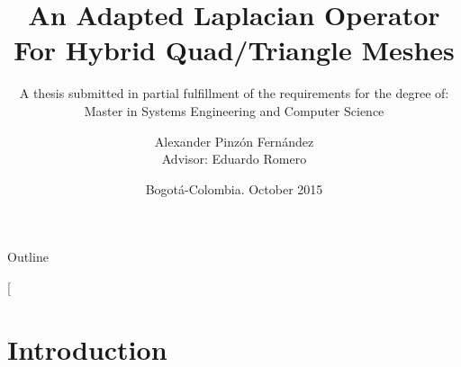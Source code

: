 \documentclass[10pt, compress, english]{beamer}
\makeatletter
\newcommand\makebeamertitle{\frame{\maketitle}}%
\let\origtableofcontents=\tableofcontents
\def\tableofcontents{\@ifnextchar[{\origtableofcontents}{\gobbletableofcontents}}
\def\gobbletableofcontents#1{\origtableofcontents}
\makeatother
\begin{document}
\title[cim@lab]{An Adapted Laplacian Operator For Hybrid Quad/Triangle Meshes}

\subtitle{\textmd{\footnotesize{}A thesis submitted in partial fulfillment
of the requirements for the degree of:}\\
Master in Systems Engineering and Computer Science}

\author[Alexander Pinzón, Eduardo Romero]{Alexander Pinzón Fernández\\
{\footnotesize{}Advisor: Eduardo Romero}}


\date{Bogotá-Colombia. October 2015}

\makebeamertitle


\begin{frame}{Outline}

\tableofcontents{}

\end{frame}

\section{Introduction}
\end{document}
